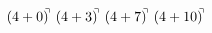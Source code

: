 \documentclass[preview]{standalone}
\begin{document}
\begin{align*}
(4+0)^{\hspace{-0.1cm}\urcorner} \ (4+3)^{\hspace{-0.1cm}\urcorner} \ (4+7)^{\hspace{-0.1cm}\urcorner} \ (4+10)^{\hspace{-0.1cm}\urcorner}
\end{align*}
\end{document}
